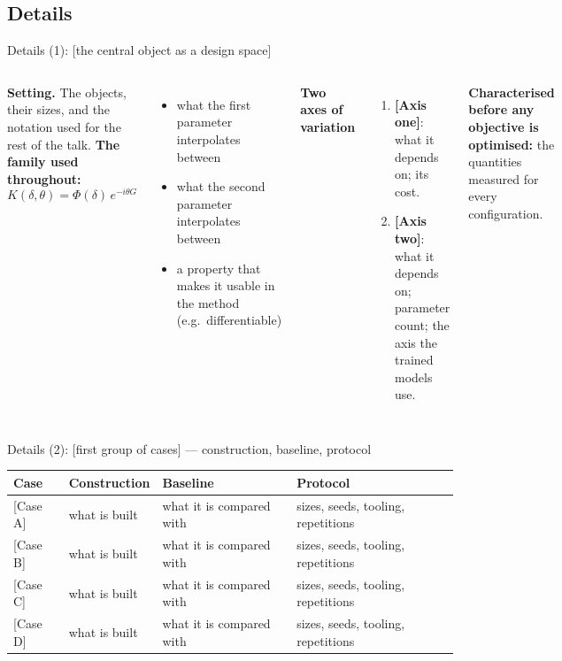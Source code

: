 \documentclass[aspectratio=43, 11pt, xcolor=dvipsnames, compress]{beamer}
\begin{document}
\subsection{Details}
\begin{frame}{Details (1): [the central object as a design space]}
  \footnotesize
  \begin{columns}[T]
      \textbf{Setting.} The objects, their sizes, and the notation used for the rest of the talk.
      \vskip0.2cm
      \textbf{The family used throughout:}
      \[
        K(\delta,\theta) = \Phi(\delta)\,e^{-i\theta G}
      \]
      \begin{itemize}
        \item what the first parameter interpolates between
        \item what the second parameter interpolates between
        \item a property that makes it usable in the method (e.g.\ differentiable)
      \end{itemize}
      \textbf{Two axes of variation}
      \begin{enumerate}
        \item \textbf{[Axis one]}: what it depends on; its cost.
        \item \textbf{[Axis two]}: what it depends on; parameter count; the axis the trained models use.
      \end{enumerate}
      \vskip0.2cm
      \textbf{Characterised before any objective is optimised:} the quantities measured for every configuration.
  \end{columns}
\end{frame}

\begin{frame}{Details (2): [first group of cases] --- construction, baseline, protocol}
  \footnotesize
  \renewcommand{\arraystretch}{1.2}
  \begin{tabularx}{\textwidth}{@{}F Y Y Y@{}}
    \toprule
    Case & Construction & Baseline & Protocol \\
    \midrule
    {}[Case A] & what is built & what it is compared with & sizes, seeds, tooling, repetitions \\
    {}[Case B] & what is built & what it is compared with & sizes, seeds, tooling, repetitions \\
    {}[Case C] & what is built & what it is compared with & sizes, seeds, tooling, repetitions \\
    {}[Case D] & what is built & what it is compared with & sizes, seeds, tooling, repetitions \\
    \bottomrule
  \end{tabularx}
\end{frame}
\end{document}
